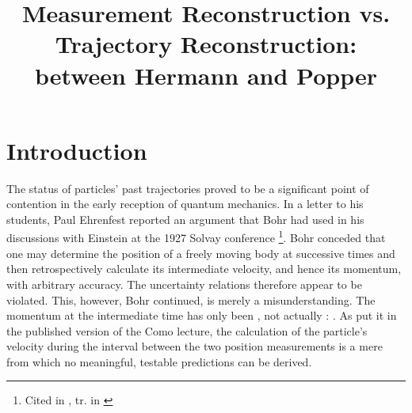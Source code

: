 \documentclass[final,12pt]{article}
\title{Measurement Reconstruction vs. Trajectory Reconstruction: \VW between Hermann and Popper}
\begin{document}
\maketitle

\section*{Introduction}

The status of particles’ past trajectories proved to be a significant point of contention in the early reception of quantum mechanics. In a letter to his students, Paul Ehrenfest reported an argument that Bohr had used in his discussions with Einstein at the 1927 Solvay conference \footnote{Cited in \cite[415–418]{Bohr1985}, tr. in \cite[37–41][415–418]{Bohr1985}}. Bohr conceded that one may determine the position of a freely moving body at successive times and then retrospectively calculate its intermediate velocity, and hence its momentum, with arbitrary accuracy. The uncertainty relations therefore appear to be violated. This, however, Bohr continued, is merely a misunderstanding. The momentum at the intermediate time has only been , not actually :  . As  put it in the published version of the Como lecture, the calculation of the particle’s velocity during the interval between the two position measurements is a mere  from which no meaningful, testable predictions can be derived. 





\end{document}
